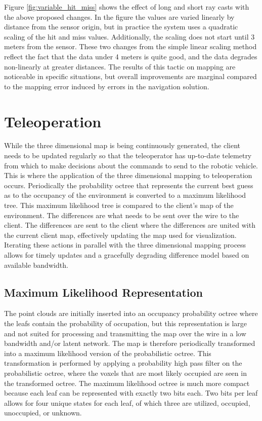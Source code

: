 \documentclass[12pt]{report}
\begin{document}
Figure \ref{fig:variable_hit_miss} shows the effect of long and short ray casts with the above proposed changes.  In the figure the values are varied linearly by distance from the sensor origin, but in practice the system uses a quadratic scaling of the hit and miss values.  Additionally, the scaling does not start until 3 meters from the sensor.  These two changes from the simple linear scaling method reflect the fact that the data under 4 meters is quite good, and the data degrades non-linearly at greater distances.  The results of this tactic on mapping are noticeable in specific situations, but overall improvements are marginal compared to the mapping error induced by errors in the navigation solution.


\chapter{Teleoperation}\label{chap:teleoperation}
While the three dimensional map is being continuously generated, the client needs to be updated regularly so that the teleoperator has up-to-date telemetry from which to make decisions about the commands to send to the robotic vehicle. This is where the application of the three dimensional mapping to teleoperation occurs. Periodically the probability octree that represents the current best guess as to the occupancy of the environment is converted to a maximum likelihood tree.  This maximum likelihood tree is compared to the client's map of the environment.  The differences are what needs to be sent over the wire to the client.  The differences are sent to the client where the differences are united with the current client map, effectively updating the map used for visualization.  Iterating these actions in parallel with the three dimensional mapping process allows for timely updates and a gracefully degrading difference model based on available bandwidth.

\section{Maximum Likelihood Representation}
The point clouds are initially inserted into an occupancy probability octree where the leafs contain the probability of occupation, but this representation is large and not suited for processing and transmitting the map over the wire in a low bandwidth and/or latent network. The map is therefore periodically transformed into a maximum likelihood version of the probabilistic octree. This transformation is performed by applying a probability high pass filter on the probabilistic octree, where the voxels that are most likely occupied are seen in the transformed octree. The maximum likelihood octree is much more compact because each leaf can be represented with exactly two bits each\cite{octomap}.  Two bits per leaf allows for four unique states for each leaf, of which three are utilized, occupied, unoccupied, or unknown.
\end{document}
